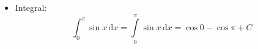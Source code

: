 \documentclass { article }
\begin{document}
\begin{itemize}
  \item Integral:
        \[
            \int_0^\pi        \sin x \, \mathrm{d} x
          = \int\limits_0^\pi \sin x \, \mathrm{d} x
          = \cos 0 - \cos\pi + C
\]
\end{itemize}
\end{document}
